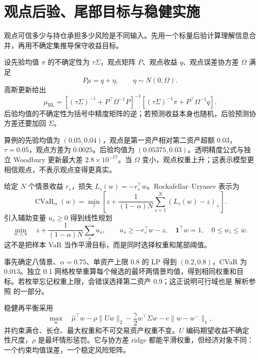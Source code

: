 \section{观点后验、尾部目标与稳健实施}
\label{ch:lower-portfolio-optimization}

\begin{itemize}
  
\end{itemize}

观点可信多少与持仓承担多少风险是不同输入。先用一个标量后验计算理解信息合并，再用不确定集推导保守收益目标。





设先验均值 $\pi$ 的不确定性为 $\tau\Sigma$，观点矩阵 $P$、观点收益 $q$、观点误差协方差 $\Omega$ 满足
\[
 P\mu=q+\eta,\qquad \eta\sim N(0,\Omega).
\]
高斯更新给出
\[
 \mu_{\mathrm{BL}}=
 \left[(\tau\Sigma)^{-1}+P^\top\Omega^{-1}P\right]^{-1}
 \left[(\tau\Sigma)^{-1}\pi+P^\top\Omega^{-1}q\right].
\]
后验均值的不确定性为括号中精度矩阵的逆；若预测收益本身也随机，后验预测协方差还要加回 $\Sigma$\cite{black1992global}。

算例的先验均值为 $(0.05,0.04)$，观点是第一资产相对第二资产超额 $0.03$，$\tau=0.05$，观点方差为 $0.0025$。后验均值为 $(0.05375,0.03)$。透明精度公式与独立 Woodbury 更新最大差 $2.8\times10^{-17}$。当 $\Omega$ 变小，观点权重上升；这表示模型更相信观点，不表示观点变得更真实。


给定 $N$ 个情景收益 $r_s$，损失 $L_s(w)=-r_s^\top w$。Rockafellar--Uryasev 表示为
\[
 \operatorname{CVaR}_\alpha(w)=
 \min_{z}\left[z+\frac{1}{(1-\alpha)N}
 \sum_{s=1}^{N}(L_s(w)-z)_+\right].
\]
引入辅助变量 $u_s\ge0$ 得到线性规划
\[
 \min_{w,z,u}\quad z+\frac{1}{(1-\alpha)N}\sum_su_s,
 \qquad u_s\ge-r_s^\top w-z,\quad
 \mathbf1^\top w=1,\quad 0\le w_i\le\bar w.
\]
这不是把样本 VaR 当作平滑目标，而是同时选择权重和尾部阈值\cite{rockafellar2000optimization}。

事先确定八情景、$\alpha=0.75$、单资产上限 $0.8$ 的 LP 得到 $(0.2,0.8)$，CVaR 为 $0.013$。独立 0.1 网格枚举重算每个候选的最坏两情景均值，得到相同权重和目标。若枚举忘记权重上限，会错误选择第二资产 0.9；这正说明可行域也是 解析参照 的一部分。


稳健再平衡采用
\[
 \max_w\quad
 \widehat\mu^\top w
 -\rho\lVert U w\rVert_2
 -\frac\gamma2w^\top\Sigma w
 -c\lVert w-w^-\rVert_1,
\]
并约束满仓、长仓、最大权重和不可交易资产权重不变。$U$ 编码期望收益不确定性尺度，$\rho$ 是最坏情形惩罚。它与协方差 ridge 都能平滑权重，但经济对象不同：一个约束均值误差，一个稳定风险矩阵。

